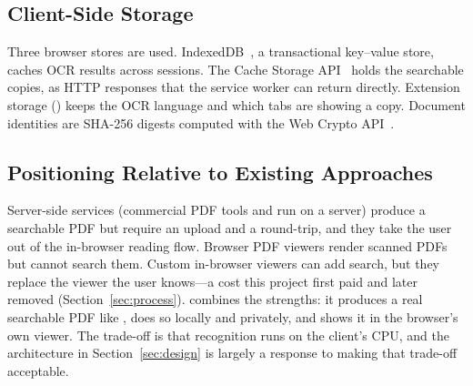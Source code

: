 \subsection{Client-Side Storage}
Three browser stores are used. IndexedDB~\cite{indexeddb}, a transactional
key--value store, caches OCR results across sessions. The Cache
Storage API~\cite{cacheapi} holds the searchable copies, as HTTP responses that the
service worker can return directly. Extension storage ()
keeps the OCR language and which tabs are showing a copy. Document identities
are SHA-256 digests computed with the Web Crypto API~\cite{webcrypto}.

\subsection{Positioning Relative to Existing Approaches}
Server-side services (commercial PDF tools and  run on a server)
produce a searchable PDF but require an upload and a round-trip, and they take
the user out of the in-browser reading flow. Browser PDF viewers render scanned
PDFs but cannot search them. Custom in-browser viewers can add search, but they
replace the viewer the user knows---a cost this project first paid and later
removed (Section~\ref{sec:process}). \proj{} combines the strengths: it produces
a real searchable PDF like , does so locally and privately, and
shows it in the browser's own viewer. The trade-off is that recognition runs on
the client's CPU, and the architecture in Section~\ref{sec:design} is largely a
response to making that trade-off acceptable.
